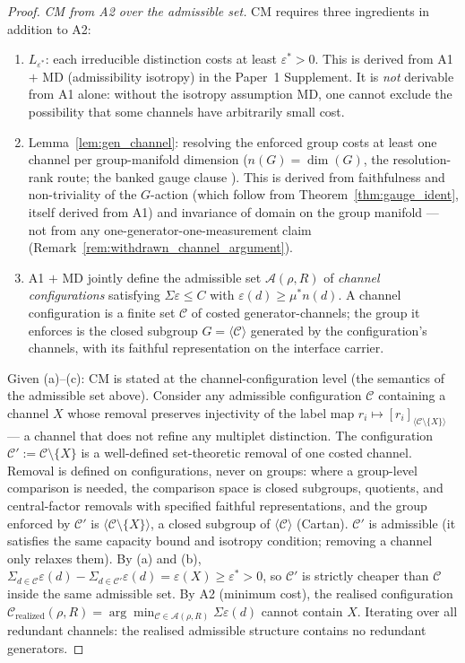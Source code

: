 \documentclass[11pt]{article}
\theoremstyle{definition}
\newcommand{\codeid}[1]{\texttt{\seqsplit{#1}}}%
\begin{document}
\begin{proof}
\textit{CM from A2 over the admissible set.}\quad
CM requires three ingredients in addition to A2:
\begin{enumerate}[label=(\alph*),nosep]
  \item $L_{\varepsilon^*}$: each irreducible distinction costs at
  least $\varepsilon^* > 0$.  This is derived from A1 $+$ MD
  (admissibility isotropy) in the Paper~1 Supplement.  It is
  \emph{not} derivable from A1 alone: without the isotropy assumption
  MD, one cannot exclude the possibility that some channels have
  arbitrarily small cost.
  \item Lemma~\ref{lem:gen_channel}: resolving the enforced group
  costs at least one channel per group-manifold dimension
  ($n(G) = \dim(G)$, the resolution-rank route; the banked gauge
  clause \codeid{check\_L\_cost\_gauge}).  This is derived from
  faithfulness and non-triviality of the $G$-action (which follow from
  Theorem~\ref{thm:gauge_ident}, itself derived from A1) and invariance
  of domain on the group manifold --- not from any
  one-generator-one-measurement claim
  (Remark~\ref{rem:withdrawn_channel_argument}).
  \item A1 $+$ MD jointly define the admissible set
  $\mathcal{A}(\rho, R)$ of \emph{channel configurations} satisfying
  $\Sigma\varepsilon \le C$ with $\varepsilon(d) \ge \mu^* n(d)$.  A
  channel configuration is a finite set $\mathcal{C}$ of costed
  generator-channels; the group it enforces is the closed subgroup
  $G = \langle \mathcal{C} \rangle$ generated by the configuration's
  channels, with its faithful representation on the interface carrier.
\end{enumerate}
Given (a)--(c): CM is stated at the channel-configuration level (the
semantics of the admissible set above).  Consider any admissible
configuration $\mathcal{C}$ containing a channel $X$ whose removal
preserves injectivity of the label map
$r_i \mapsto [r_i]_{\langle \mathcal{C} \setminus \{X\}\rangle}$ ---
a channel that does not refine any multiplet distinction.  The
configuration $\mathcal{C}' := \mathcal{C} \setminus \{X\}$ is a
well-defined set-theoretic removal of one costed channel.  Removal is
defined on configurations, never on groups: where a group-level
comparison is needed, the comparison space is closed subgroups,
quotients, and central-factor removals with specified faithful
representations, and the group enforced by $\mathcal{C}'$ is
$\langle \mathcal{C} \setminus \{X\}\rangle$, a closed subgroup of
$\langle \mathcal{C} \rangle$ (Cartan).  $\mathcal{C}'$ is admissible
(it satisfies the same capacity bound and isotropy condition; removing
a channel only relaxes them).  By (a) and (b),
$\Sigma_{d \in \mathcal{C}} \varepsilon(d) - \Sigma_{d \in \mathcal{C}'}
\varepsilon(d) = \varepsilon(X) \ge \varepsilon^* > 0$, so
$\mathcal{C}'$ is strictly cheaper than $\mathcal{C}$ inside the same
admissible set.  By A2 (minimum cost), the realised configuration
$\mathcal{C}_{\mathrm{realized}}(\rho, R)
= \arg\min_{\mathcal{C} \in \mathcal{A}(\rho, R)} \Sigma\varepsilon(d)$
cannot contain $X$.  Iterating over all redundant channels: the
realised admissible structure contains no redundant generators.
\end{proof}
\end{document}
